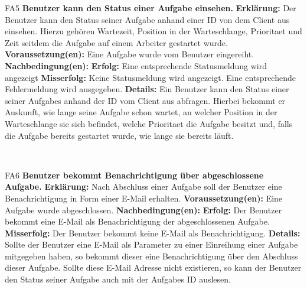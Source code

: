 \documentclass[a4paper,12pt]{article}
\begin{document}
\begin{itemize}[nosep]
	\begin{minipage}[t]{\linewidth}
		\item[FA5] \textbf{\gls{Benutzer} kann den Status einer \gls{Aufgabe} einsehen.}
		\subitem \textbf{Erklärung:} Der \gls{Benutzer} kann den Status seiner \gls{Aufgabe} anhand einer ID von dem \gls{Client} aus einsehen. Hierzu gehören Wartezeit, Position in der \gls{Warteschlange}, \gls{Prioritaet} und Zeit seitdem die \gls{Aufgabe} auf einem \gls{Arbeiter} gestartet wurde.
		\subitem \textbf{Voraussetzung(en):} Eine \gls{Aufgabe} wurde vom \gls{Benutzer} eingereiht.
		\subitem \textbf{Nachbedingung(en):}
		\subsubitem \textbf{Erfolg:} Eine entsprechende Statusmeldung wird angezeigt
		\subsubitem \textbf{Misserfolg:} Keine Statusmeldung wird angezeigt. Eine entsprechende Fehlermeldung wird ausgegeben.
		\subitem \textbf{Details:} Ein \gls{Benutzer} kann den Status einer seiner \glspl{Aufgabe} anhand der ID vom \gls{Client} aus abfragen. Hierbei bekommt er Auskunft, wie lange seine \gls{Aufgabe} schon wartet, an welcher Position in der \gls{Warteschlange} sie sich befindet, welche \gls{Prioritaet} die \gls{Aufgabe} besitzt und, falls die \gls{Aufgabe} bereits gestartet wurde, wie lange sie bereits läuft.
	\end{minipage}
	\newline
	\\
	
	
	\begin{minipage}[t]{\linewidth}
		\item[FA6] \textbf{\gls{Benutzer} bekommt Benachrichtigung über abgeschlossene \gls{Aufgabe}.}
		\subitem \textbf{Erklärung:} Nach Abschluss einer \gls{Aufgabe} soll der \gls{Benutzer} eine Benachrichtigung in Form einer E-Mail erhalten.
		\subitem \textbf{Voraussetzung(en):} Eine \gls{Aufgabe} wurde abgeschlossen.
		\subitem \textbf{Nachbedingung(en):}
		\subsubitem \textbf{Erfolg:} Der \gls{Benutzer} bekommt eine E-Mail als Benachrichtigung der abgeschlossenen \gls{Aufgabe}.
		\subsubitem \textbf{Misserfolg:} Der \gls{Benutzer} bekommt keine E-Mail als Benachrichtigung.
		\subitem \textbf{Details:} Sollte der \gls{Benutzer} eine E-Mail als \gls{Parameter} zu einer Einreihung einer \gls{Aufgabe} mitgegeben haben, so bekommt dieser eine Benachrichtigung über den Abschluss dieser \gls{Aufgabe}. Sollte diese E-Mail Adresse nicht existieren, so kann der \gls{Benutzer} den Status seiner \gls{Aufgabe} auch mit der \glspl{Aufgabe} ID auslesen.
    \end{minipage}	
	\newline
	\\
	

\end{itemize}
\end{document}
